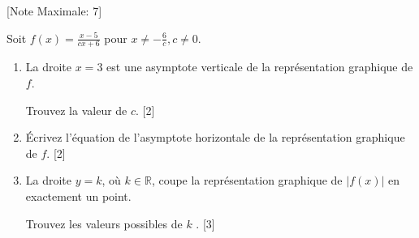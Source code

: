 \begin{question}
  \hspace*{\fill} [Note Maximale: 7]\par
  \medskip
  \noindent Soit $f(x) = \frac{x - 5}{cx + 6}$ pour $x \ne  -\frac{6}{c}, c \ne 0$.\par
  \medskip
  \begin{enumerate}[label=(\alph*)]
    \item La droite $x = 3$ est une asymptote verticale de la représentation graphique de $f$.\par Trouvez la
valeur de $c$.\hspace*{\fill} [2]
    \item Écrivez l'équation de l'asymptote horizontale de la représentation graphique de $f$.\hspace*{\fill} [2]
    \item La droite $y=k$, où $k \in \mathbb{R}$, coupe la représentation graphique de $\lvert f(x) \rvert$ en exactement un point.\par Trouvez les valeurs possibles de $k$ .\hspace*{\fill} [3]
  \end{enumerate}
\end{question}
